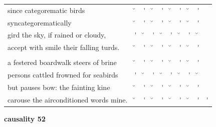 \documentclass[12pt, landscape]{article}
\begin{document}
\begin{center}
\begin{tabularx}{\textwidth}{
>{\lefting\arraybackslash}X
c
c
c
c
c
c
c
c
c
}

since categorematic birds & \u{} & \'{} & \u{} & \'{} & \u{} & \'{} & \u{} & \'{} & \\
syncategorematically & \u{} & \'{} & \u{} & \'{} & \u{} & \'{} & \u{} & \'{} & \\
gird the sky, if rained or cloudy, & \'{} & \u{} & \'{} & \u{} & \'{} & \u{} & \'{} & \u{} \\
accept with smile their falling turds. & \u{} & \'{} & \u{} & \'{} & \u{} & \'{} & \u{} & \'{} & \\
 & & & & & & & & \\
a festered boardwalk steers of brine & \u{} & \'{} & \u{} & \'{} & \u{} & \'{} & \u{} & \'{} & \\
persons cattled frowned for seabirds & \'{} & \u{} & \'{} & \u{} & \'{} & \u{} & \'{} & \u{} \\
but pauses bow: the fainting kine & \u{} & \'{} & \u{} & \'{} & \u{} & \'{} & \u{} & \'{} & \\
carouse the airconditioned words mine. & \u{} & \'{} & \u{} & \'{} & \u{} & \'{} & \u{} & \'{} & \'{} \\

\end{tabularx}
\end{center}

\vspace*{\fill}

\newpage

\vspace*{\fill}

\noindent \textbf{causality 52}
\noindent \hfill \par
\end{document}
